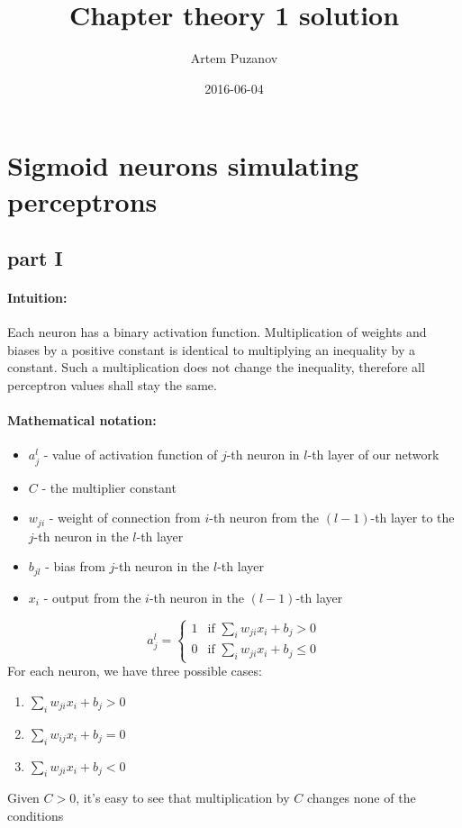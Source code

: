 \documentclass{article}
\title{Chapter theory 1 solution}
\date{2016-06-04}
\author{Artem Puzanov}
\begin{document}
\maketitle
{}
\newpage
{}

\section{Sigmoid neurons simulating perceptrons}
\subsection{part I}
\paragraph{Intuition:} 
Each neuron has a binary activation function. Multiplication of weights and biases 
by a positive constant is identical to multiplying an inequality by a constant. Such a multiplication does not change
the inequality, therefore all perceptron values shall stay the same.
\paragraph{Mathematical notation:} 
\begin{itemize}
\item $a_{j}^l$ - value of activation function of $j$-th neuron in $l$-th layer of our network
\item $C$ -  the multiplier constant
\item $w_{ji}$ - weight of connection from $i$-th neuron from the $(l-1)$-th layer to the $j$-th neuron in the $l$-th layer 
\item $b_{jl}$ - bias from $j$-th neuron in the $l$-th layer
\item $x_i$ - output from the $i$-th neuron in the $(l-1)$-th layer
\end{itemize}
\[
a_{j}^l = 
\begin{cases}
1 & \text{if } \sum_{i}w_{ji}x_i + b_j > 0 \\
0 & \text{if } \sum_{i}w_{ji}x_i + b_j \leq 0
\end{cases}
\]
For each neuron, we have three possible cases:
\begin{enumerate}
\item $\sum_{i}w_{ji}x_i + b_j > 0$
\item $\sum_{i}w_{ij}x_i + b_j = 0$
\item $\sum_{i}w_{ji}x_i + b_j < 0$
\end{enumerate}
Given $C > 0$, it's easy to see that multiplication by $C$ changes none of the conditions
\end{document}
